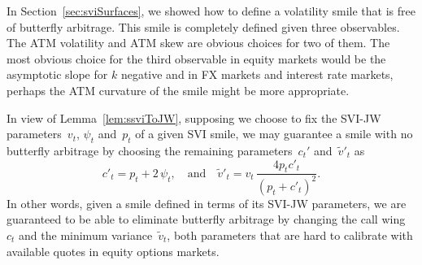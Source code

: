 \documentclass[12pt]{article}
\numberwithin{equation}{section}
\begin{document}
In Section~\ref{sec:sviSurfaces}, we showed how to define a volatility smile that is free of butterfly arbitrage.
This smile is completely defined given three observables.
The ATM volatility and ATM skew are obvious choices for two of them.
The most obvious choice for the third observable in equity markets would be the asymptotic slope for $k$ negative and in FX markets and interest rate markets, perhaps the ATM curvature of the smile might be more appropriate.




In view of Lemma~\ref{lem:ssviToJW}, supposing we choose to fix the SVI-JW parameters~$v_t$, $\psi_t$ and~$p_t$ of a given SVI smile, we may guarantee a smile with no butterfly arbitrage by choosing the  remaining parameters~$c_t'$ and~$\widetilde{v}'_{t}$ as
$$
c'_t = p_t+2\,\psi_t,
\quad\text{and}\quad
\widetilde{v}'_t = v_t\, \frac{4p_t c'_t}{\left(p_t+c'_t\right)^2}.
$$
In other words, given a smile defined in terms of its SVI-JW parameters, we are guaranteed to be able to eliminate butterfly arbitrage by changing the call wing~$c_t$ and the minimum variance~$\widetilde v_t$, both parameters that are hard to calibrate with available quotes in equity options markets.
\end{document}
